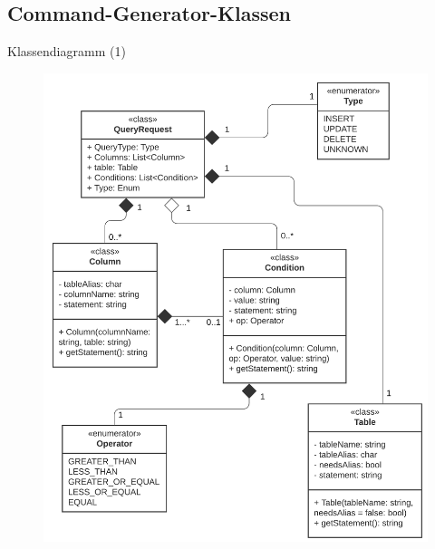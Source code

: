 \documentclass[toc]{beamer}
\begin{document}
        \subsection{Command-Generator-Klassen}
        \begin{frame}{Klassendiagramm (1)}
        
        
            \begin{figure}[htp]
                   \includegraphics[scale=0.695]{UML-Klasse.png}
                    
                    \end{figure}
        \end{frame}
        
\end{document}
